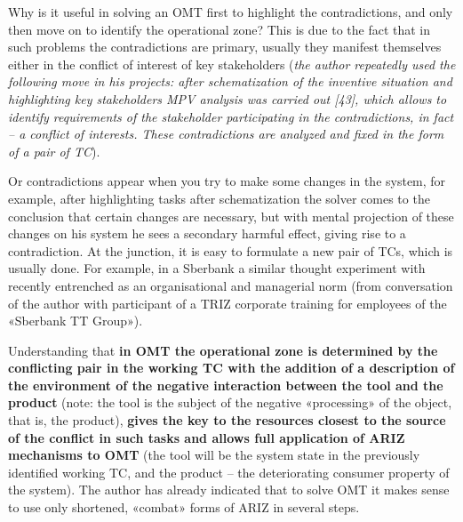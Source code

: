 \documentclass[11pt,a4paper]{book}
\begin{document}
Why is it useful in solving an OMT first to highlight the contradictions, and
only then move on to identify the operational zone?  This is due to the fact
that in such problems the contradictions are primary, usually they manifest
themselves either in the conflict of interest of key stakeholders (\emph{the
  author repeatedly used the following move in his projects: after
  schematization of the inventive situation and highlighting key stakeholders
  MPV analysis was carried out [43], which allows to identify requirements of
  the stakeholder participating in the contradictions, in fact -- a conflict
  of interests.  These contradictions are analyzed and fixed in the form of a
  pair of TC}).

Or contradictions appear when you try to make some changes in the system, for
example, after highlighting tasks after schematization the solver comes to the
conclusion that certain changes are necessary, but with mental projection of
these changes on his system he sees a secondary harmful effect, giving rise to
a contradiction. At the junction, it is easy to formulate a new pair of TCs,
which is usually done. For example, in a Sberbank a similar thought experiment
with recently entrenched as an organisational and managerial norm (from
conversation of the author with participant of a TRIZ corporate training for
employees of the «Sberbank TT Group»).

Understanding that \textbf{in OMT the operational zone is determined by the
  conflicting pair in the working TC with the addition of a description of the
  environment of the negative interaction between the tool and the product}
(note: the tool is the subject of the negative «processing» of the object,
that is, the product), \textbf{gives the key to the resources closest to the
  source of the conflict in such tasks and allows full application of ARIZ
  mechanisms to OMT} (the tool will be the system state in the previously
identified working TC, and the product -- the deteriorating consumer property
of the system). The author has already indicated that to solve OMT it makes
sense to use only shortened, «combat» forms of ARIZ in several steps.
\end{document}
